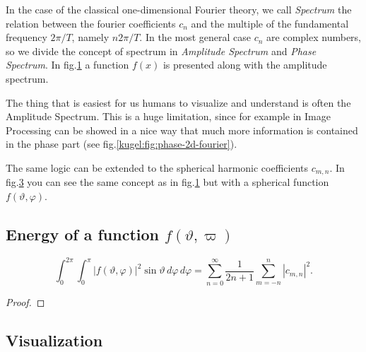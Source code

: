\begin{figure}
  \centering
  \caption{}
  \label{kugel:fig:1d-fourier}
\end{figure}

In the case of the classical one-dimensional Fourier theory, we call \emph{Spectrum} the relation between the fourier coefficients $c_n$ and the multiple 
of the fundamental frequency $2\pi/T$, namely $n 2\pi/T$. In the most general case $c_n$ are complex numbers, so we divide the concept of spectrum in 
\emph{Amplitude Spectrum} and \emph{Phase Spectrum}. In fig.\ref{kugel:fig:1d-fourier} a function $f(x)$ is presented along with the amplitude spectrum.

\begin{figure}
  \centering
  \caption{}
  \label{kugel:fig:phase&amplitude-2d-fourier}
\end{figure}

The thing that is easiest for us humans to visualize and understand is often the Amplitude Spectrum.
This is a huge limitation, since for example in Image Processing can be showed in a nice way that much more information is contained in the phase part (see fig.\ref{kugel:fig:phase-2d-fourier}).

\begin{figure}
  \centering
  \caption{}
  \label{kugel:fig:fourier-on-sphere-increasing-index}
\end{figure}

The same logic can be extended to the spherical harmonic coefficients $c_{m,n}$. In fig.\ref{kugel:fig:fourier-on-sphere-increasing-index} you can see the same concept as in fig.\ref{kugel:fig:1d-fourier} 
but with a spherical function $f(\vartheta, \varphi)$.

\subsection{Energy of a function $f(\vartheta, \varpi)$}

\begin{lemma}
  \begin{equation*}
    \int_0^{2\pi}\int_0^\pi |f(\vartheta, \varphi)|^2  \sin\vartheta \, d\varphi \, d\varphi = \sum_{n=0}^\infty \frac{1}{2n+1} \sum_{m=-n}^n |c_{m,n}|^2.
  \end{equation*}
\end{lemma}
\begin{proof}
\end{proof}

\subsection{Visualization}
